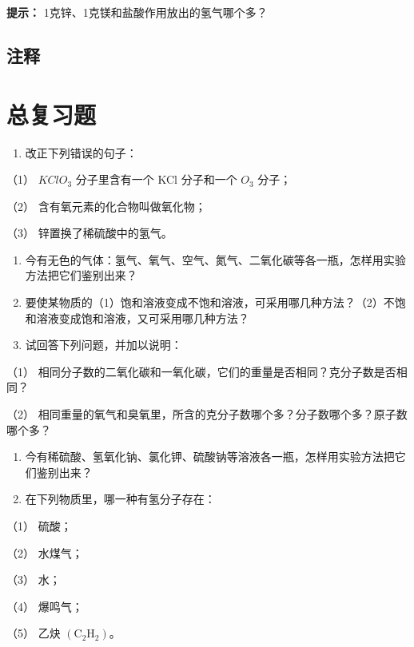 \begin{shulihuadef}
\textbf{提示：} 1克锌、1克镁和盐酸作用放出的氢气哪个多？
\end{shulihuadef}

\section{注释}

\chapter{总复习题}

\begin{enumerate}
\item
  改正下列错误的句子：
\end{enumerate}

（1） \(KClO_{3}\) 分子里含有一个 KCl 分子和一个 \(O_{3}\) 分子；

（2） 含有氧元素的化合物叫做氧化物；

（3） 锌置换了稀硫酸中的氢气。

\begin{enumerate}[start=2]
\item
  今有无色的气体：氢气、氧气、空气、氮气、二氧化碳等各一瓶，怎样用实验方法把它们鉴别出来？
\item
  要使某物质的（1）饱和溶液变成不饱和溶液，可采用哪几种方法？（2）不饱和溶液变成饱和溶液，又可采用哪几种方法？
\item
  试回答下列问题，并加以说明：
\end{enumerate}

（1）
相同分子数的二氧化碳和一氧化碳，它们的重量是否相同？克分子数是否相同？

（2）
相同重量的氧气和臭氧里，所含的克分子数哪个多？分子数哪个多？原子数哪个多？

\begin{enumerate}[start=5]
\item
  今有稀硫酸、氢氧化钠、氯化钾、硫酸钠等溶液各一瓶，怎样用实验方法把它们鉴别出来？
\item
  在下列物质里，哪一种有氢分子存在：
\end{enumerate}

（1） 硫酸；

（2） 水煤气；

（3） 水；

（4） 爆鸣气；

（5） 乙炔 \(\left(\mathrm{C}_{2}\mathrm{H}_{2}\right)\)。

